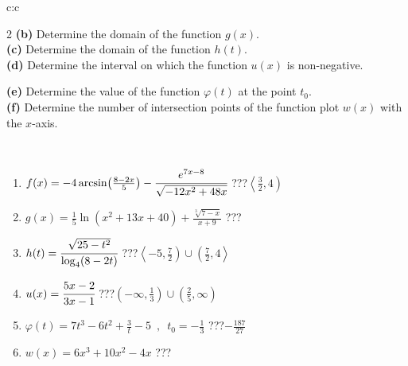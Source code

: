 \documentclass[10pt]{report}
\begin{document}
\begin{tabular}{c:c}
\begin{minipage}[c][104.5mm][t]{0.5\linewidth}
\begin{center}
\begin{minipage}{0.95\linewidth}
\begin{center}
{\begin{multicols}{2}
\textbf{(b)} Determine the domain of the function \(g(x)\). \\[1mm]
\textbf{(c)} Determine the domain of the function \(h(t)\). \\[1mm]
\textbf{(d)} Determine the interval on which the function \(u(x)\) is non-negative. \par \columnbreak
\textbf{(e)} Determine the value of the function \(\varphi(t)\) at the point \(t_0\). \\[1mm]
\textbf{(f)} Determine the number of intersection points of the function plot \(w(x)\) with the \(x\)-axis. \\[1mm]
\end{multicols}
}
\end{center}
\end{minipage}
\\[4mm]
\begin{minipage}{0.79\linewidth}
\begin{center}
\begin{varwidth}{\linewidth}
\begin{enumerate}
\small
\item $f(x) = -4\arcsin\!\left( \frac{8-2x}{5} \right) - \cfrac{e^{7x-8}}{\sqrt{-12x^2+48x}}$\quad \dotfill\; ???\;\dotfill \quad $\left\langle\frac{3}{2} , 4\right)$
\item $g(x) = \frac{1}{5} \ln{\!(x^2+13x+40)}+\frac{\sqrt[3]{7-x}}{x+9}$\quad \dotfill\; ???\;\dotfill {}
\item $h(t) = \cfrac{\sqrt{25-t^2}}{\log_4(8-2t)}$\quad \dotfill\; ???\;\dotfill \quad $\left\langle-5 , \frac{7}{2}\right)\cup\left(\frac{7}{2} , 4\right\rangle$
\item $u(x) = \cfrac{5x-2}{3x-1}$\quad \dotfill\; ???\;\dotfill \quad $\left(-\infty , \frac{1}{3}\right)\cup\left(\frac{2}{5} , \infty\right)$
\item $\varphi(t) = 7t^3-6t^2+\frac{3}{t}-5 \enspace , \enspace t_0=-\frac{1}{3}$\quad \dotfill\; ???\;\dotfill \quad $-\frac{187}{27}$
\item $w(x) = 6x^3+10x^2-4x$\quad \dotfill\; ???\;\dotfill {}
\end{enumerate}
\end{varwidth}
\end{center}
\end{minipage}
\begin{minipage}{0.20\linewidth}
\begin{center}

\end{center}
\end{minipage}
\end{center}
\end{minipage}
\end{tabular}
\end{document}

